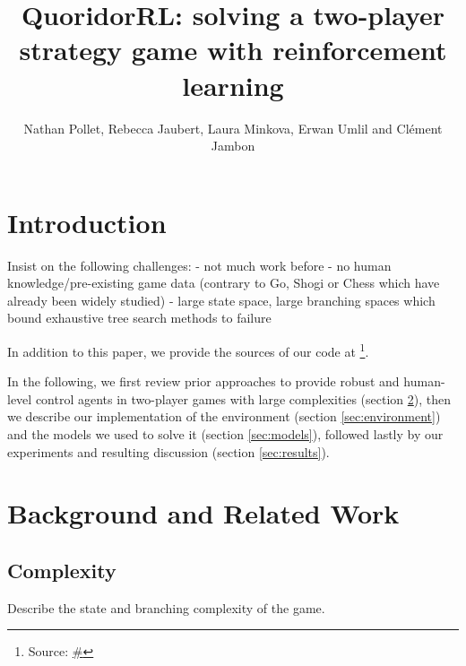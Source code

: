 \documentclass[journal, a4paper]{IEEEtran}
\newif\ifanonymous
\begin{document}
\title{QuoridorRL: solving a two-player strategy game with reinforcement learning}
\ifanonymous
\author{Anonymous Authors}
\else
\author{Nathan Pollet, Rebecca Jaubert, Laura Minkova, Erwan Umlil and Clément Jambon}
\fi
\maketitle

\begin{abstract}

\end{abstract}

\section{Introduction}
\label{sec:intro}

Insist on the following challenges:
- not much work before
- no human knowledge/pre-existing game data (contrary to Go, Shogi or Chess which have already been widely studied)
- large state space, large branching spaces which bound exhaustive tree search methods to failure

In addition to this paper, we provide the sources of our code at  \footnote{Source: \url{#}}. 

In the following, we first review prior approaches to provide robust and human-level control agents in two-player games with large complexities (section \ref{sec:background}), then we describe our implementation of the environment (section \ref{sec:environment}) and the models we used to solve it (section \ref{sec:models}), followed lastly by our experiments and resulting discussion (section \ref{sec:results}).

\section{Background and Related Work}
\label{sec:background}

\subsection{Complexity}
\label{ssec:complexity}
Describe the state and branching complexity of the game.
\end{document}
